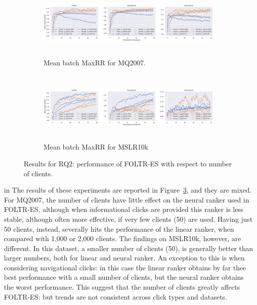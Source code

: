 \begin{figure}[t]
	\centering
	\begin{subfigure}{1\textwidth}
		\includegraphics[width=15cm, height=3.5cm]{images/RQ2/mq2007_foltr_client_both_p0.9.png}
		\caption{Mean batch MaxRR for MQ2007.}
		\label{fig:mq2007-rq2}
	\end{subfigure}
	\begin{subfigure}{1\textwidth}
		\includegraphics[width=15cm, height=3.5cm]{images/RQ2/mslr10k_foltr_client_both_p0.9.png}
		\caption{Mean batch MaxRR for MSLR10k}
		\label{fig:mslr10k-rq2}
	\end{subfigure}
	\caption{Results for RQ2: performance of FOLTR-ES with respect to number of clients. \label{fig:RQ2}} 
\end{figure}

in 
The results of these experiments are reported in Figure~\ref{fig:RQ2}, and they are mixed. For MQ2007, the number of clients have little effect on the neural ranker used in FOLTR-ES, although when informational clicks are provided this ranker is less stable, although often more effective, if very few clients (50) are used. Having just 50 clients, instead, severally hits the performance of the linear ranker, when compared with 1,000 or 2,000 clients. The findings on MSLR10k, however, are different. In this dataset, a smaller number of clients (50), is generally better than larger numbers, both for linear and neural ranker. An exception to this is when considering navigational clicks: in this case the linear ranker obtains by far thee best performance with a small number of clients, but the neural ranker obtains the worst performance. This suggest that the number of clients greatly affects FOLTR-ES: but trends are not consistent across click types and datasets. 


